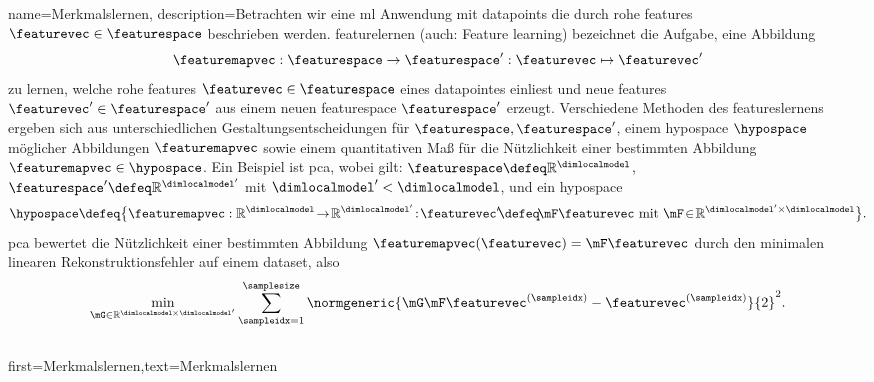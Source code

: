 {{
{name={Merkmalslernen},
	description={Betrachten wir eine  \gls{ml} Anwendung mit  \glspl{datapoint} die durch rohe  \glspl{feature} $\featurevec \in \featurespace$ beschrieben 
		werden. \Gls{feature}lernen  (auch: Feature learning)  bezeichnet die Aufgabe, eine Abbildung
		$$\featuremapvec: \featurespace \rightarrow \featurespace': \featurevec \mapsto \featurevec'$$ 
		zu lernen, welche rohe \glspl{feature} $\featurevec \in \featurespace$ eines \gls{datapoint}es einliest 
		und neue \glspl{feature} $\featurevec' \in \featurespace'$ aus einem neuen \gls{featurespace} 
		$\featurespace'$ erzeugt. Verschiedene Methoden des \gls{feature}slernens ergeben sich aus unterschiedlichen 
		Gestaltungsentscheidungen für $\featurespace,\featurespace'$,  einem \gls{hypospace} $\hypospace$ möglicher Abbildungen $\featuremapvec$
		sowie einem quantitativen Maß für die Nützlichkeit einer bestimmten Abbildung  $\featuremapvec \in \hypospace$.
		Ein Beispiel ist \gls{pca}, wobei gilt: 
		$\featurespace \defeq \mathbb{R}^{\dimlocalmodel}$, $\featurespace' \defeq \mathbb{R}^{\dimlocalmodel'}$ 
		mit $\dimlocalmodel' < \dimlocalmodel$, und ein \gls{hypospace}
		$$\hypospace\defeq \big\{ \featuremapvec: \mathbb{R}^{\dimlocalmodel}
		\!\rightarrow\! \mathbb{R}^{\dimlocalmodel'}\!:\!\featurevec'\!\defeq\!\mF \featurevec \mbox{ mit } \mF \!\in\! \mathbb{R}^{\dimlocalmodel' \times \dimlocalmodel} \big\}.$$
		\Gls{pca} bewertet die Nützlichkeit einer bestimmten Abbildung $\featuremapvec(\featurevec)= \mF \featurevec$ 
		durch den \gls{minimalen} linearen Rekonstruktionsfehler auf einem \gls{dataset}, also
		$$\min_{\mG \in \mathbb{R}^{\dimlocalmodel \!\!\!\times \dimlocalmodel'}} \sum_{\sampleidx=1}^{\samplesize} \normgeneric{\mG \mF \featurevec^{(\sampleidx)} - \featurevec^{(\sampleidx)}}{2}^{2}.$$ 
			\\ 
	
	first={Merkmalslernen},text={Merkmalslernen}
} 

}}}
